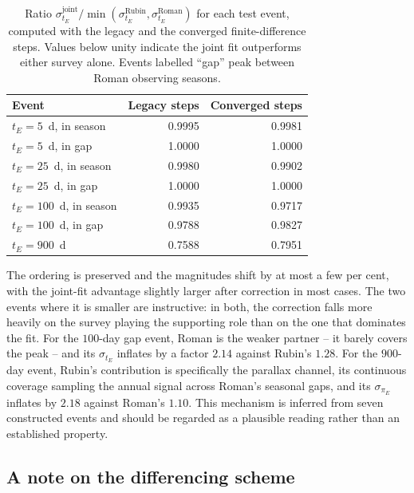 \begin{table}[htbp]
	\centering
	\caption{Ratio $\sigma_{t_E}^{\mathrm{joint}} / \min(\sigma_{t_E}^{\mathrm{Rubin}},
	\sigma_{t_E}^{\mathrm{Roman}})$ for each test event, computed with the legacy and the converged
	finite-difference steps. Values below unity indicate the joint fit outperforms either survey
	alone. Events labelled ``gap'' peak between Roman observing seasons.}
	\label{tab:stepratio}
	\begin{tabular}{lrr}
		\toprule
		Event & Legacy steps & Converged steps \\
		\midrule
		$t_E = 5$~d, in season    & 0.9995 & 0.9981 \\
		$t_E = 5$~d, in gap       & 1.0000 & 1.0000 \\
		$t_E = 25$~d, in season   & 0.9980 & 0.9902 \\
		$t_E = 25$~d, in gap      & 1.0000 & 1.0000 \\
		$t_E = 100$~d, in season  & 0.9935 & 0.9717 \\
		$t_E = 100$~d, in gap     & 0.9788 & 0.9827 \\
		$t_E = 900$~d             & 0.7588 & 0.7951 \\
		\bottomrule
	\end{tabular}
\end{table}

The ordering is preserved and the magnitudes shift by at most a few per cent, with the joint-fit
advantage slightly larger after correction in most cases. The two events where it is smaller are
instructive: in both, the correction falls more heavily on the survey playing the supporting role
than on the one that dominates the fit. For the $100$-day gap event, Roman is the weaker partner --
it barely covers the peak -- and its $\sigma_{t_E}$ inflates by a factor $2.14$ against Rubin's
$1.28$. For the $900$-day event, Rubin's contribution is specifically the parallax channel, its
continuous coverage sampling the annual signal across Roman's seasonal gaps, and its
$\sigma_{\pi_E}$ inflates by $2.18$ against Roman's $1.10$. This mechanism is inferred from seven
constructed events and should be regarded as a plausible reading rather than an established
property.

\subsection{A note on the differencing scheme}
\label{app:stepsize_stencil}

